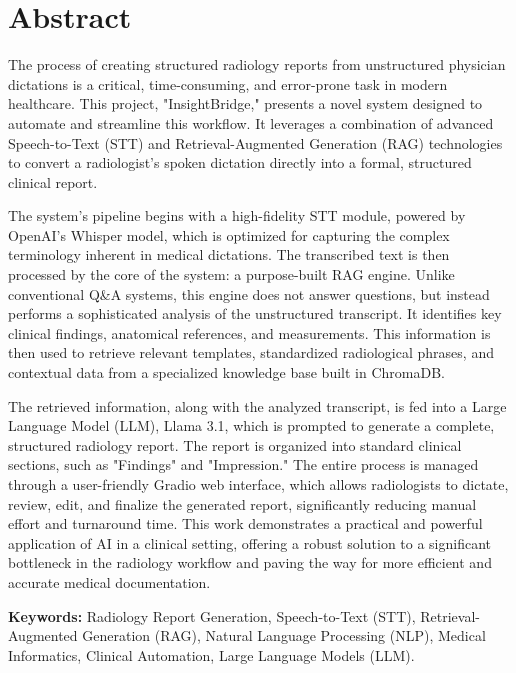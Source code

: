 \chapter*{Abstract}

The process of creating structured radiology reports from unstructured physician dictations is a critical, time-consuming, and error-prone task in modern healthcare. This project, "InsightBridge," presents a novel system designed to automate and streamline this workflow. It leverages a combination of advanced Speech-to-Text (STT) and Retrieval-Augmented Generation (RAG) technologies to convert a radiologist's spoken dictation directly into a formal, structured clinical report.

The system's pipeline begins with a high-fidelity STT module, powered by OpenAI's Whisper model, which is optimized for capturing the complex terminology inherent in medical dictations. The transcribed text is then processed by the core of the system: a purpose-built RAG engine. Unlike conventional Q\&A systems, this engine does not answer questions, but instead performs a sophisticated analysis of the unstructured transcript. It identifies key clinical findings, anatomical references, and measurements. This information is then used to retrieve relevant templates, standardized radiological phrases, and contextual data from a specialized knowledge base built in ChromaDB.

The retrieved information, along with the analyzed transcript, is fed into a Large Language Model (LLM), Llama 3.1, which is prompted to generate a complete, structured radiology report. The report is organized into standard clinical sections, such as "Findings" and "Impression." The entire process is managed through a user-friendly Gradio web interface, which allows radiologists to dictate, review, edit, and finalize the generated report, significantly reducing manual effort and turnaround time. This work demonstrates a practical and powerful application of AI in a clinical setting, offering a robust solution to a significant bottleneck in the radiology workflow and paving the way for more efficient and accurate medical documentation.

\vfill
\textbf{Keywords:} Radiology Report Generation, Speech-to-Text (STT), Retrieval-Augmented Generation (RAG), Natural Language Processing (NLP), Medical Informatics, Clinical Automation, Large Language Models (LLM).
\clearpage